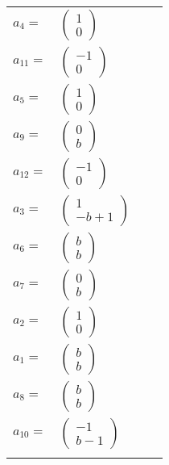 \documentclass[1p]{elsarticle_modified}
\theoremstyle{definition}
\begin{document}
\begin{tabular}{m{7pt} m{180pt} m{7pt} m{180pt} }
\flushright $a_{4}=$&$\begin{pmatrix}1\\0\end{pmatrix}$ \\
\flushright $a_{11}=$&$\begin{pmatrix}-1\\0\end{pmatrix}$ \\
\flushright $a_{5}=$&$\begin{pmatrix}1\\0\end{pmatrix}$ \\
\flushright $a_{9}=$&$\begin{pmatrix}0\\b\end{pmatrix}$ \\
\flushright $a_{12}=$&$\begin{pmatrix}-1\\0\end{pmatrix}$ \\
\flushright $a_{3}=$&$\begin{pmatrix}1\\- b+1\end{pmatrix}$ \\
\flushright $a_{6}=$&$\begin{pmatrix}b\\b\end{pmatrix}$ \\
\flushright $a_{7}=$&$\begin{pmatrix}0\\b\end{pmatrix}$ \\
\flushright $a_{2}=$&$\begin{pmatrix}1\\0\end{pmatrix}$ \\
\flushright $a_{1}=$&$\begin{pmatrix}b\\b\end{pmatrix}$ \\
\flushright $a_{8}=$&$\begin{pmatrix}b\\b\end{pmatrix}$ \\
\flushright $a_{10}=$&$\begin{pmatrix}-1\\b-1\end{pmatrix}$\\&\end{tabular}
\end{document}
